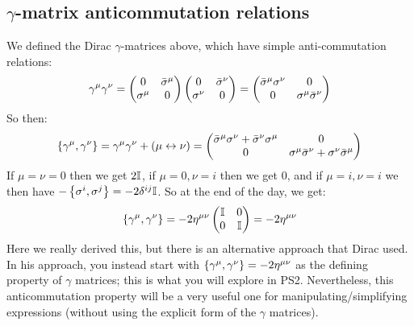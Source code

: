 \subsection{$\gamma$-matrix anticommutation relations}
We defined the Dirac $\gamma$-matrices above, which have simple anti-commutation relations:
\begin{equation}
    \gamma^\mu\gamma^\nu = \begin{pmatrix}0 & \bar{\sigma}^\mu \\ \sigma^\mu & 0\end{pmatrix}\begin{pmatrix}0 & \bar{\sigma}^\nu \\ \sigma^\nu & 0\end{pmatrix} = \begin{pmatrix}\bar{\sigma}^\mu \sigma^\nu & 0 \\ 0 & \sigma^\mu \bar{\sigma}^\nu\end{pmatrix}
\end{equation}
So then:
\begin{equation}
    \set{\gamma^\mu, \gamma^\nu} = \gamma^\mu\gamma^\nu + (\mu \leftrightarrow \nu) = \begin{pmatrix}\bar{\sigma}^\mu \sigma^\nu + \bar{\sigma}^\nu \sigma^\mu & 0 \\ 0 & \sigma^\mu \bar{\sigma}^\nu + \sigma^\nu \bar{\sigma}^\mu\end{pmatrix}
\end{equation}
If $\mu = \nu = 0$ then we get $2\mathbb{I}$, if $\mu = 0, \nu = i$ then we get 0, and if $\mu = i, \nu = i$ we then have $-\set{\sigma^i, \sigma^j} = -2\delta^{ij}\mathbb{I}$. So at the end of the day, we get:
\begin{equation}
    \set{\gamma^\mu, \gamma^\nu} = -2\eta^{\mu\nu}\begin{pmatrix}\mathbb{I} & 0 \\ 0 & \mathbb{I}\end{pmatrix} = -2\eta^{\mu\nu}
\end{equation}
Here we really derived this, but there is an alternative approach that Dirac used. In his approach, you instead start with $ \set{\gamma^\mu, \gamma^\nu} = -2\eta^{\mu\nu}$ as the defining property of $\gamma$ matrices; this is what you will explore in PS2. Nevertheless, this anticommutation property will be a very useful one for manipulating/simplifying expressions (without using the explicit form of the $\gamma$ matrices).

